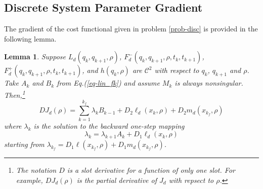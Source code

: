 \documentclass[letterpaper, 10pt, conference]{ieeeconf}
\newtheorem{lemma}{Lemma}
\begin{document}
\subsection{Discrete System Parameter Gradient}
The gradient of the cost functional given in problem \ref{prob-disc} is provided in the following lemma.
\begin{lemma}
\label{lem-grad_a}
Suppose $L_d(q_k,q_{k+1},\rho)$, $F_d^-(q_k,q_{k+1},\rho,t_k,t_{k+1})$, $F_d^+(q_k,q_{k+1},\rho,t_k,t_{k+1})$, and $h(q_k,\rho)$ are $\mathcal{C}^2$ with respect to $q_k$, $q_{k+1}$ and $\rho$.  Take $A_k$ and $B_k$ from Eq.(\ref{eq-lin_fk}) and assume $M_k$ is always nonsingular.  Then,\footnote{The notation $D$ is a slot derivative for a function of only one slot.  For example, $DJ_d(\rho)$ is the partial derivative of $J_d$ with repsect to $\rho$.}
\begin{equation}
DJ_d(\rho) = \sum_{k = 1}^{k_f}\lambda_kB_{k-1} +D_2\ell_d(x_k,\rho) + D_2m_d(x_{k_f},\rho)
\label{eq-DJa}
\end{equation}
where $\lambda_k$ is the solution to the backward one-step mapping
\begin{equation}
\lambda_k = \lambda_{k+1}A_{k} + D_1\ell_d(x_{k},\rho) 
\label{eq-lambda}
\end{equation}
starting from $\lambda_{k_f} = D_1\ell(x_{k_f},\rho) + D_1m_d(x_{k_f},\rho)$.  
\end{lemma}
\end{document}
